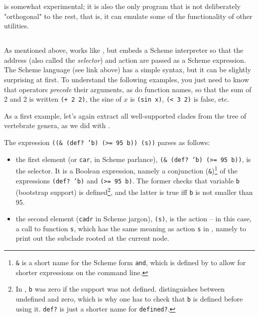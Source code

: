 \ed{} is somewhat experimental; it is also the only program that is not
deliberately "orthogonal" to the rest, that is, it can emulate some of the
functionality of other utilities.

\subsection{\sched}

As mentioned above, \sched{} works like \ed{}, but embeds a Scheme interpreter
so that the address (also called the {\em selector}) and action are passed as a
Scheme expression. The Scheme language (see link above) has a simple syntax,
but it can be slightly surprising at first. To understand the following
examples, you just need to know that operators \emph{precede} their arguments,
as do function names, so that the sum of 2 and 2 is written \texttt{(+ 2 2)},
the sine of $x$ is \texttt{(sin x)}, \texttt{(< 3 2)} is false, etc.

\noindent{}As a first example, let's again extract all
well-supported clades from the tree of vertebrate genera, as we did with \ed.


\begin{samepage}

\end{samepage}

The expression \texttt{((\& (def? 'b) (>= 95 b)) (s))} parses as follows:
\begin{itemize}
	\item the first element (or \texttt{car}, in Scheme parlance),
	\texttt{(\& (def? 'b) (>= 95 b))}, is the selector.  It is a Boolean
	expression, namely a conjunction (\texttt{\&})\footnote{\texttt{\&} is
	a short name for the Scheme form \texttt{and}, which is defined by
	\sched{} to allow for shorter expressions on the command line.} of the
	expressions \texttt{(def? 'b)} and \texttt{(>= 95 b)}.  The former
	checks that variable \texttt{b} (bootstrap support) is
	defined\footnote{In \ed, \texttt{b} was zero if the support was not
	defined. \sched{} distinguishes between undefined and zero, which is
	why one has to check that \texttt{b} is defined before using it.
	\texttt{def?} is just a shorter name for \texttt{defined?}.}, and the
	latter is true iff \texttt{b} is not smaller than 95.
	\item the second element (\texttt{cadr} in Scheme jargon),
	\texttt{(s)}, is the action -- in this case, a call to function
	\texttt{s}, which has the same meaning as action \texttt{s} in \ed,
	namely to print out the subclade rooted at the current node.
\end{itemize}

